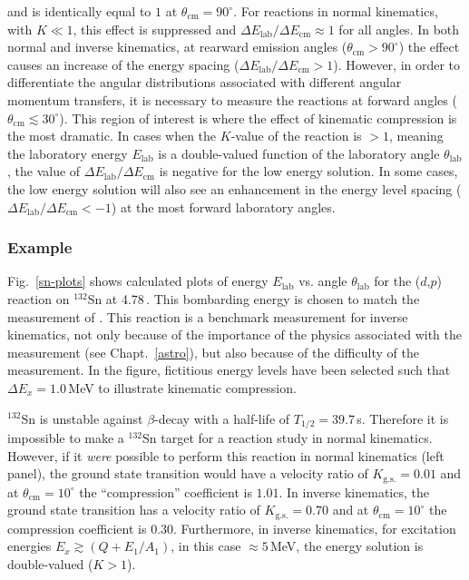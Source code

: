 and is identically equal to $1$ at $\theta_\mathrm{cm}=90^\circ$.  For reactions in normal kinematics, with $K \ll 1$, this effect is suppressed and $\Delta E_\mathrm{lab}/\Delta E_\mathrm{cm}\approx 1$ for all angles.  In both normal and inverse kinematics, at rearward emission angles ($\theta_\mathrm{cm}>90^\circ$) the effect causes an increase of the energy spacing ($\Delta E_\mathrm{lab}/\Delta E_\mathrm{cm}> 1$).  
However, in order to differentiate the angular distributions associated with different angular momentum transfers, it is necessary to measure the reactions at forward angles ($\theta_\textrm{cm} \lesssim 30^\circ$).  This region of interest is where the effect of kinematic compression is the most dramatic.  
In cases when the $K$-value of the reaction is $>1$, meaning the laboratory energy $E_\mathrm{lab}$ is a double-valued function of the laboratory angle $\theta_\mathrm{lab}$, the value of $\Delta E_\mathrm{lab}/\Delta E_\mathrm{cm}$ is negative for the low energy solution.  In some cases,  the low energy solution will also see an enhancement in the energy level spacing ($\Delta E_\mathrm{lab}/\Delta E_\mathrm{cm}< -1$) at the most forward laboratory angles.

\subsubsection{Example}
Fig.~\ref{sn-plots} shows calculated plots of energy $E_\textrm{lab}$ vs. angle $\theta_\textrm{lab}$ %
for the ($d$,$p$) reaction on $^{132}$Sn at 4.78\,\AMeV.  This bombarding energy is chosen to match the measurement of \citet{Jones_2010}.  This reaction is a benchmark measurement for inverse kinematics, not only because of the importance of the physics associated with the measurement (see Chapt.~\ref{astro}), but also because of the difficulty of the measurement.  In the figure, fictitious energy levels have been selected such that $\Delta E_x=1.0$\,MeV to illustrate kinematic compression.

$^{132}$Sn is unstable against $\beta$-decay with a half-life of $T_{1/2}=39.7$\,s.  Therefore it is impossible to make a $^{132}$Sn target for a reaction study in normal kinematics.  However, if it \textit{were} possible to perform this reaction in normal kinematics (left panel), the ground state transition would have a velocity ratio of $K_\mathrm{g.s.}=0.01$ and at $\theta_\mathrm{cm}=10^\circ$ the ``compression'' coefficient is $1.01$.  In inverse kinematics, the ground state transition has a velocity ratio of $K_\mathrm{g.s.}=0.70$ and at $\theta_\mathrm{cm}=10^\circ$ the compression coefficient is $0.30$.  Furthermore, in inverse kinematics, for excitation energies $E_x \gtrsim (Q+E_1/A_1)$, in this case $\approx 5$\,MeV, the energy solution is double-valued ($K>1$).  

